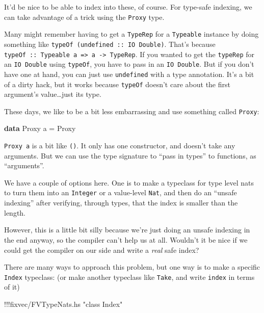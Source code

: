 \documentclass[]{article}
\newenvironment{Shaded}{}{}
\newcommand{\KeywordTok}[1]{\textcolor[rgb]{0.00,0.44,0.13}{\textbf{{#1}}}}
\newcommand{\DataTypeTok}[1]{\textcolor[rgb]{0.56,0.13,0.00}{{#1}}}
\newcommand{\StringTok}[1]{\textcolor[rgb]{0.25,0.44,0.63}{{#1}}}
\newcommand{\FunctionTok}[1]{\textcolor[rgb]{0.02,0.16,0.49}{{#1}}}
\newcommand{\NormalTok}[1]{{#1}}
\begin{document}
It'd be nice to be able to index into these, of course. For type-safe
indexing, we can take advantage of a trick using the \texttt{Proxy}
type.

Many might remember having to get a \texttt{TypeRep} for a
\texttt{Typeable} instance by doing something like
\texttt{typeOf\ (undefined\ ::\ IO\ Double)}. That's because
\texttt{typeOf\ ::\ Typeable\ a\ =\textgreater{}\ a\ -\textgreater{}\ TypeRep}.
If you wanted to get the \texttt{typeRep} for an \texttt{IO\ Double}
using \texttt{typeOf}, you have to pass in an \texttt{IO\ Double}. But
if you don't have one at hand, you can just use \texttt{undefined} with
a type annotation. It's a bit of a dirty hack, but it works because
\texttt{typeOf} doesn't care about the first argument's
value\ldots{}just its type.

These days, we like to be a bit less embarrassing and use something
called \texttt{Proxy}:

\begin{Shaded}
\begin{Highlighting}[]
\KeywordTok{data} \DataTypeTok{Proxy} \NormalTok{a }\FunctionTok{=} \DataTypeTok{Proxy}
\end{Highlighting}
\end{Shaded}

\texttt{Proxy\ a} is a bit like \texttt{()}. It only has one
constructor, and doesn't take any arguments. But we can use the type
signature to ``pass in types'' to functions, as ``arguments''.

We have a couple of options here. One is to make a typeclass for type
level nats to turn them into an \texttt{Integer} or a value-level
\texttt{Nat}, and then do an ``unsafe indexing'' after verifying,
through types, that the index is smaller than the length.

However, this is a little bit silly because we're just doing an unsafe
indexing in the end anyway, so the compiler can't help us at all.
Wouldn't it be nice if we could get the compiler on our side and write a
\emph{real} safe index?

There are many ways to approach this problem, but one way is to make a
specific \texttt{Index} typeclass: (or make another typeclass like
\texttt{Take}, and write \texttt{index} in terms of it)

\begin{Shaded}
\begin{Highlighting}[]
\FunctionTok{!!!}\NormalTok{fixvec}\FunctionTok{/}\NormalTok{FVTypeNats.hs }\StringTok{"class Index"}
\end{Highlighting}
\end{Shaded}
\end{document}
